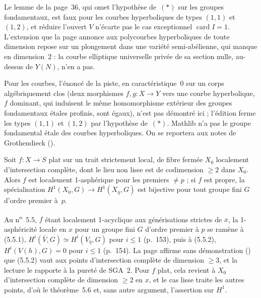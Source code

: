 \begin{encadre}
\begin{contrexemple*}\nonverifie
Le lemme de la page~36, qui omet l'hypothèse de~$(\ast)$ sur les groupes fondamentaux, est faux pour les courbes hyperboliques de types $(1,1)$ et $(1,2)$, et réduire l'ouvert $V$ n'écarte pas le cas exceptionnel $\operatorname{card} I = 1$. L'extension que la page annonce aux polycourbes hyperboliques de toute dimension repose sur un plongement dans une variété semi-abélienne, qui manque en dimension~$2$ : la courbe elliptique universelle privée de sa section nulle, au-dessus de $Y(N)$, n'en a pas.
\end{contrexemple*}
\end{encadre}
{\small Pour les courbes, l'énoncé de la piste, en caractéristique~$0$ sur un corps algébriquement clos (deux morphismes $f, g : X \to Y$ vers une courbe hyperbolique, $f$ dominant, qui induisent le même homomorphisme extérieur des groupes fondamentaux étales profinis, sont égaux), n'est pas démontré ici ; l'édition ferme les types $(1,1)$ et $(1,2)$ par l'hypothèse de~$(\ast)$. Mathlib n'a pas le groupe fondamental étale des courbes hyperboliques. On se reportera aux notes de Grothendieck ().\par}

\begin{encadre}
\begin{theoreme*}\nonverifie
Soit $f : X \to S$ plat sur un trait strictement local, de fibre fermée $X_0$ localement d'intersection complète, dont le lieu non lisse est de codimension $\geq 2$ dans $X_0$. Alors $f$ est localement 1-asphérique pour les premiers $\neq p$ ; si $f$ est propre, la spécialisation $H^1(X_0, G) \to H^1(X_{\bar\eta}, G)$ est bijective pour tout groupe fini $G$ d'ordre premier à~$p$.
\end{theoreme*}
\end{encadre}
\begin{demopage}[pages 153 à 155]
Au n\textsuperscript{o}~5.5, $f$ étant localement 1-acyclique aux générisations strictes de $x$, la 1-asphéricité locale en $x$ pour un groupe fini $G$ d'ordre premier à $p$ se ramène à (5.5.1), $H^i(\bar V, G) \simeq H^i(V_{\bar\eta}, G)$ pour $i \leq 1$ (p.~153), puis à (5.5.2), $H^i(V(h), G) = 0$ pour $i \leq 1$ (p.~154). La page affirme sans démonstration () que (5.5.2) vaut aux points d'intersection complète de dimension $\geq 3$, et la lecture le rapporte à la pureté de SGA~2. Pour $f$ plat, cela revient à $X_0$ d'intersection complète de dimension $\geq 2$ en $x$, et le cas lisse traite les autres points, d'où le théorème~5.6 et, sans autre argument, l'assertion sur $H^1$.
\end{demopage}

